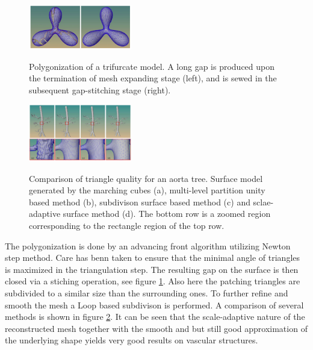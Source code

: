 \begin{figure}[h]
	\centering
	\includegraphics[width=0.4\textwidth]{./Images/Polygonization.png} \\
	\caption{Polygonization of a trifurcate model. A long gap is produced upon the termination of mesh
		expanding stage (left), and is sewed in the subsequent gap-stitching stage (right).}
	\cite{wu2010scale}
	\label{fig:Polygonization}
\end{figure} 

\begin{figure}[h]
	\centering
	\includegraphics[width=0.4\textwidth]{./Images/TriangleQuality.png} \\
	\caption{ Comparison of triangle quality for an aorta tree. Surface model generated by the marching cubes (a),
		multi-level partition unity based method (b), subdivison surface based method (c) and sclae-adaptive surface method (d). The bottom row is a zoomed region corresponding to the rectangle region of the top row.}
	\cite{wu2010scale}
	\label{fig:TriangleQuality}
\end{figure} 

The polygonization is done by an advancing front algorithm utilizing Newton step method. Care has benn taken to ensure that the minimal angle of triangles is maximized in the triangulation step. The resulting gap on the surface is then closed via a stiching operation, see figure \ref{fig:Polygonization}. Also here the patching triangles are subdivided to a similar size than the surrounding ones. To further refine and smooth the mesh a Loop based subdivison is performed.
A comparison of several methods is shown in figure \ref{fig:TriangleQuality}. It can be seen that the scale-adaptive nature of the reconstructed mesh together with the smooth and but still good approximation of the underlying shape yields very good results on vascular structures. 
